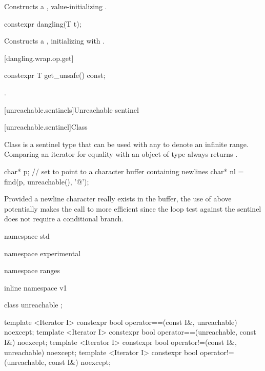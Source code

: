\begin{itemdescr}
\pnum
\effects Constructs a , value-initializing .
\end{itemdescr}

%
\begin{itemdecl}
constexpr dangling(T t);
\end{itemdecl}

\begin{itemdescr}
\pnum
\effects Constructs a , initializing  with .
\end{itemdescr}

[dangling.wrap.op.get]{}

%
%
\begin{itemdecl}
constexpr T get_unsafe() const;
\end{itemdecl}

\begin{itemdescr}
\pnum
\returns {}.
\end{itemdescr}

[unreachable.sentinels]{Unreachable sentinel}

[unreachable.sentinel]{Class }

\pnum
{}%
Class  is a sentinel type that can be used with any
 to denote an infinite range. Comparing an iterator for equality with
an object of type  always returns .

\enterexample
\begin{codeblock}
char* p;
// set  to point to a character buffer containing newlines
char* nl = find(p, unreachable(), '@\textbackslash@n');
\end{codeblock}

Provided a newline character really exists in the buffer, the use of 
above potentially makes the call to  more efficient since the loop test against
the sentinel does not require a conditional branch.
\exitexample

\begin{codeblock}
namespace std { namespace experimental { namespace ranges { inline namespace v1 {
  class unreachable { };

  template <Iterator I>
    constexpr bool operator==(const I&, unreachable) noexcept;
  template <Iterator I>
    constexpr bool operator==(unreachable, const I&) noexcept;
  template <Iterator I>
    constexpr bool operator!=(const I&, unreachable) noexcept;
  template <Iterator I>
    constexpr bool operator!=(unreachable, const I&) noexcept;
}}}}
\end{codeblock}

